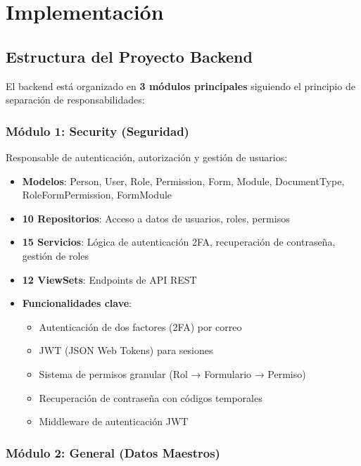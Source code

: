 \section{Implementación}

\subsection{Estructura del Proyecto Backend}

El backend está organizado en \textbf{3 módulos principales} siguiendo el principio de separación de responsabilidades:

\subsubsection{Módulo 1: Security (Seguridad)}

Responsable de autenticación, autorización y gestión de usuarios:

\begin{itemize}
    \item \textbf{Modelos}: Person, User, Role, Permission, Form, Module, DocumentType, RoleFormPermission, FormModule
    \item \textbf{10 Repositorios}: Acceso a datos de usuarios, roles, permisos
    \item \textbf{15 Servicios}: Lógica de autenticación 2FA, recuperación de contraseña, gestión de roles
    \item \textbf{12 ViewSets}: Endpoints de API REST
    \item \textbf{Funcionalidades clave}:
    \begin{itemize}
        \item Autenticación de dos factores (2FA) por correo
        \item JWT (JSON Web Tokens) para sesiones
        \item Sistema de permisos granular (Rol → Formulario → Permiso)
        \item Recuperación de contraseña con códigos temporales
        \item Middleware de autenticación JWT
    \end{itemize}
\end{itemize}

\subsubsection{Módulo 2: General (Datos Maestros)}


